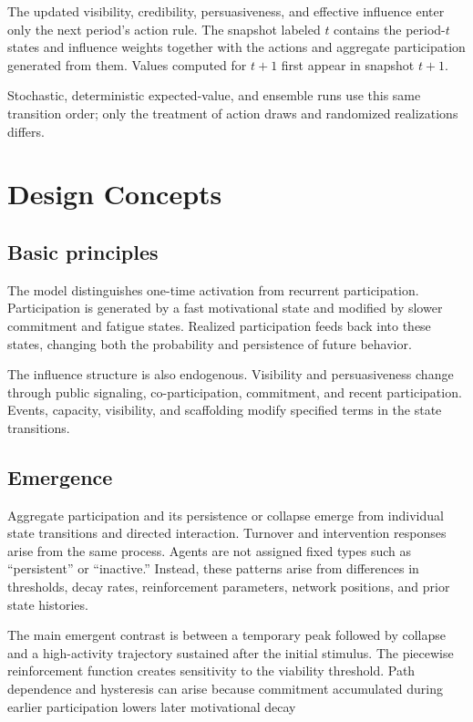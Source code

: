 \documentclass[11pt]{article}
\begin{document}
The updated visibility, credibility, persuasiveness, and effective influence enter only the next period's action rule. The snapshot labeled \(t\) contains the period-\(t\) states and influence weights together with the actions and aggregate participation generated from them. Values computed for \(t+1\) first appear in snapshot \(t+1\).

Stochastic, deterministic expected-value, and ensemble runs use this same transition order; only the treatment of action draws and randomized realizations differs.

\section{Design Concepts}
\subsection{Basic principles}
The model distinguishes one-time activation from recurrent participation. Participation is generated by a fast motivational state and modified by slower commitment and fatigue states. Realized participation feeds back into these states, changing both the probability and persistence of future behavior.

The influence structure is also endogenous. Visibility and persuasiveness change through public signaling, co-participation, commitment, and recent participation. Events, capacity, visibility, and scaffolding modify specified terms in the state transitions.

\subsection{Emergence}
Aggregate participation and its persistence or collapse emerge from individual state transitions and directed interaction. Turnover and intervention responses arise from the same process. Agents are not assigned fixed types such as “persistent” or “inactive.” Instead, these patterns arise from differences in thresholds, decay rates, reinforcement parameters, network positions, and prior state histories.

The main emergent contrast is between a temporary peak followed by collapse and a high-activity trajectory sustained after the initial stimulus. The piecewise reinforcement function creates sensitivity to the viability threshold. Path dependence and hysteresis can arise because commitment accumulated during earlier participation lowers later motivational decay
\end{document}
